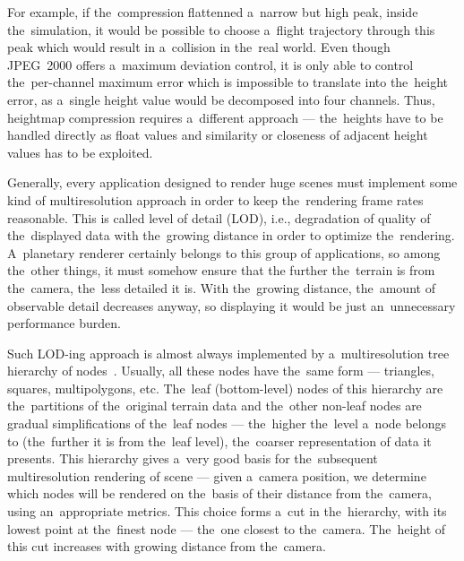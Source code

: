 For example, if the~compression flattenned a~narrow but high peak, inside the~simulation, it would be possible to choose a~flight trajectory through this peak which would result in a~collision in the~real world. Even though JPEG~2000 offers a~maximum deviation control, it is only able to control the~per-channel maximum error which is impossible to translate into the~height error, as a~single height value would be decomposed into four channels. Thus, heightmap compression requires a~different approach --- the~heights have to be handled directly as float values and similarity or closeness of adjacent height values has to be exploited.

Generally, every application designed to render huge scenes must implement some kind of multiresolution approach in order to keep the~rendering frame rates reasonable. This is called level of detail (LOD), i.e., degradation of quality of the~displayed data with the~growing distance in order to optimize the~rendering. A~planetary renderer certainly belongs to this group of applications, so among the~other things, it must somehow ensure that the further the~terrain is from the~camera, the~less detailed it is. With the~growing distance, the~amount of observable detail decreases anyway, so displaying it would be just an~unnecessary performance burden. 

Such LOD-ing approach is almost always implemented by a~multiresolution tree hierarchy of nodes~\cite{survey}. Usually, all these nodes have the~same form --- triangles, squares, multipolygons, etc. The~leaf (bottom-level) nodes of this hierarchy are the~partitions of the~original terrain data and the~other non-leaf nodes are gradual simplifications of the~leaf nodes --- the~higher the~level a~node belongs to (the~further it is from the~leaf level), the~coarser representation of data it presents. This hierarchy gives a~very good basis for the~subsequent multiresolution rendering of scene --- given a~camera position, we determine which nodes will be rendered on the~basis of their distance from the~camera, using an~appropriate metrics. This choice forms a~cut in the~hierarchy, with its lowest point at the~finest node --- the~one closest to the~camera. The~height of this cut increases with growing distance from the~camera. 

